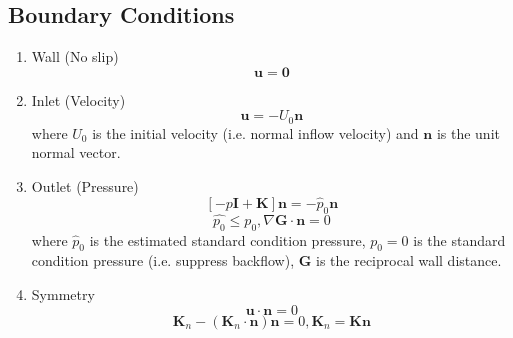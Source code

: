 \documentclass{report}
\begin{document}
        \subsection{Boundary Conditions}
            \begin{enumerate}
                \item Wall (No slip)
                    \begin{equation}
                        \mathbf{u} = \mathbf{0}
                    \end{equation}
            
                \item Inlet (Velocity)
                    \begin{equation}
                        \mathbf{u} = -U_{0} \mathbf{n}
                    \end{equation}
                        where \(U_{0}\) is the initial velocity (i.e. normal inflow velocity) and \(\mathbf{n}\) is the unit normal vector. 
                
                \item Outlet (Pressure)
                    \begin{equation}
                        \left[-p\textbf{I} + \textbf{K} \right]\mathbf{n} = - \hat{p}_{0} \mathbf{n} %
                    \end{equation}
                    \begin{equation}
                        \hat{p_{0}} \leq p_{0}, \nabla \mathbf{G} \cdot \mathbf{n} = 0
                    \end{equation}
                        where \(\hat{p}_{0}\) is the estimated standard condition pressure, \(p_{0}=0\) is the standard condition pressure (i.e. suppress backflow), \(\mathbf{G}\) is the reciprocal wall distance. 
            
                \item Symmetry 
                    \begin{equation}
                        \mathbf{u} \cdot \mathbf{n} = 0
                    \end{equation}
                    \begin{equation}
                        \mathbf{K}_{n} - (\mathbf{K}_{n} \cdot \mathbf{n})\mathbf{n} = 0, \mathbf{K}_{n} = \mathbf{Kn}
                    \end{equation}
            \end{enumerate}
            
\end{document}
